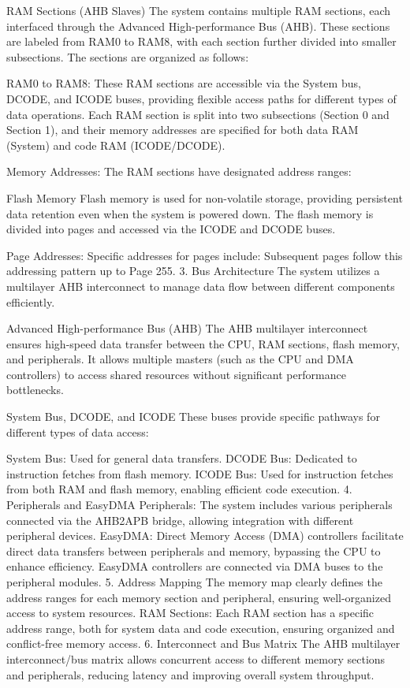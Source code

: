 \documentclass{Configuration_Files/PoliMi3i_thesis}
\begin{document}
RAM Sections (AHB Slaves)
The system contains multiple RAM sections, each interfaced through the Advanced High-performance Bus (AHB). These sections are labeled from RAM0 to RAM8, with each section further divided into smaller subsections. The sections are organized as follows:

RAM0 to RAM8: These RAM sections are accessible via the System bus, DCODE, and ICODE buses, providing flexible access paths for different types of data operations. Each RAM section is split into two subsections (Section 0 and Section 1), and their memory addresses are specified for both data RAM (System) and code RAM (ICODE/DCODE).

Memory Addresses: The RAM sections have designated address ranges:

Flash Memory
Flash memory is used for non-volatile storage, providing persistent data retention even when the system is powered down. The flash memory is divided into pages and accessed via the ICODE and DCODE buses.

Page Addresses: Specific addresses for pages include:
Subsequent pages follow this addressing pattern up to Page 255.
3. Bus Architecture
The system utilizes a multilayer AHB interconnect to manage data flow between different components efficiently.

Advanced High-performance Bus (AHB)
The AHB multilayer interconnect ensures high-speed data transfer between the CPU, RAM sections, flash memory, and peripherals. It allows multiple masters (such as the CPU and DMA controllers) to access shared resources without significant performance bottlenecks.

System Bus, DCODE, and ICODE
These buses provide specific pathways for different types of data access:

System Bus: Used for general data transfers.
DCODE Bus: Dedicated to instruction fetches from flash memory.
ICODE Bus: Used for instruction fetches from both RAM and flash memory, enabling efficient code execution.
4. Peripherals and EasyDMA
Peripherals: The system includes various peripherals connected via the AHB2APB bridge, allowing integration with different peripheral devices.
EasyDMA: Direct Memory Access (DMA) controllers facilitate direct data transfers between peripherals and memory, bypassing the CPU to enhance efficiency. EasyDMA controllers are connected via DMA buses to the peripheral modules.
5. Address Mapping
The memory map clearly defines the address ranges for each memory section and peripheral, ensuring well-organized access to system resources.
RAM Sections: Each RAM section has a specific address range, both for system data and code execution, ensuring organized and conflict-free memory access.
6. Interconnect and Bus Matrix
The AHB multilayer interconnect/bus matrix allows concurrent access to different memory sections and peripherals, reducing latency and improving overall system throughput.
\end{document}
